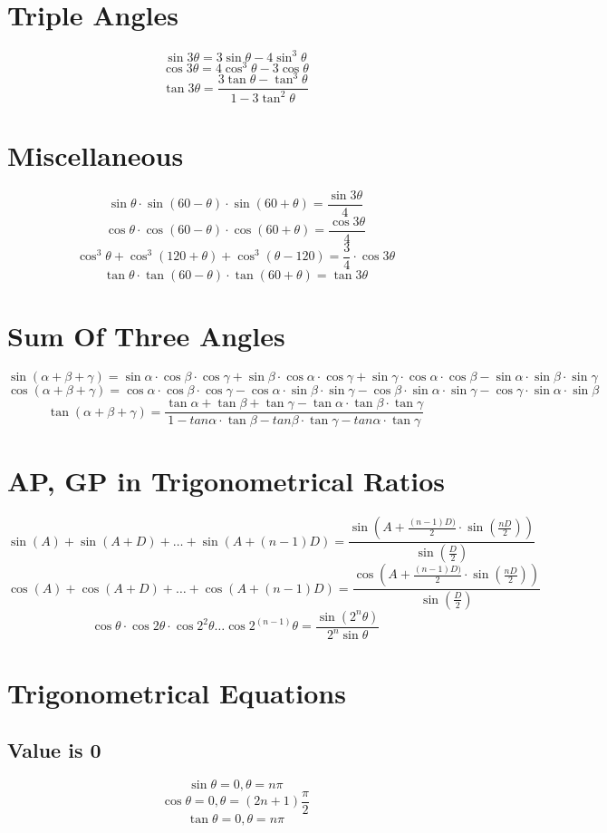 \documentclass[fleqn, a4paper]{article}
\begin{document}
\section{Triple Angles}
\[\sin3\theta = 3\sin\theta - 4\sin^3\theta\]
\[\cos3\theta = 4\cos^3\theta - 3\cos\theta\]
\[\tan3\theta = \frac{3\tan\theta - \tan^3\theta}{1 - 3\tan^2\theta}\]

\section{Miscellaneous}
\[\sin\theta\cdot\sin(60-\theta)\cdot\sin(60+\theta) = \frac{\sin3\theta}{4}\]
\[\cos\theta\cdot\cos(60-\theta)\cdot\cos(60+\theta) = \frac{\cos3\theta}{4}\]
\[\cos^3\theta + \cos^3(120+\theta) + \cos^3(\theta - 120) = \frac{3}{4}\cdot\cos3\theta\]
\[\tan\theta\cdot\tan(60-\theta)\cdot\tan(60+\theta) = \tan3\theta\]
\[\]
\[\]
\[\]
\[\]
\section{Sum Of Three Angles}
\[\sin(\alpha + \beta + \gamma) = \sin\alpha\cdot\cos\beta\cdot\cos\gamma + \sin\beta\cdot\cos\alpha\cdot\cos\gamma + \sin\gamma\cdot\cos\alpha\cdot\cos\beta - \sin\alpha\cdot\sin\beta\cdot\sin\gamma\]
\[\cos(\alpha + \beta + \gamma) = \cos\alpha\cdot\cos\beta\cdot\cos\gamma - \cos\alpha\cdot\sin\beta\cdot\sin\gamma - \cos\beta\cdot\sin\alpha\cdot\sin\gamma - \cos\gamma\cdot\sin\alpha\cdot\sin\beta\]
\[\tan(\alpha + \beta + \gamma) = \frac{\tan\alpha + \tan\beta + \tan\gamma - \tan\alpha\cdot\tan\beta\cdot\tan\gamma}{1 - tan\alpha\cdot\tan\beta - tan\beta\cdot\tan\gamma - tan\alpha\cdot\tan\gamma}\] 

\section{AP, GP in Trigonometrical Ratios}
\[\sin(A) + \sin(A+D) + \ldots + \sin(A+(n-1)D) = \frac{\sin(A+\frac{(n-1)D)}{2}\cdot\sin(\frac{nD}{2}))}{\sin(\frac{D}{2})}\]
\[\cos(A) + \cos(A+D) + \ldots + \cos(A+(n-1)D) = \frac{\cos(A+\frac{(n-1)D)}{2}\cdot\sin(\frac{nD}{2}))}{\sin(\frac{D}{2})}\]
\[\cos\theta\cdot\cos2\theta\cdot\cos2^2\theta\ldots\cos2^{(n-1)}\theta =
\frac{\sin(2^n\theta)}{2^n\sin\theta}\]

\section{Trigonometrical Equations}
\subsection{Value is 0}
\[\sin\theta = 0, \theta = n\pi\]
\[\cos\theta = 0, \theta = (2n+1)\frac{\pi}{2}\]
\[\tan\theta = 0, \theta = n\pi\]
\end{document}
